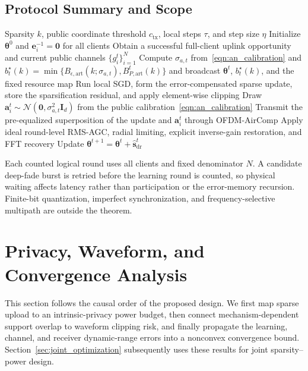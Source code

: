 \documentclass[journal]{IEEEtran}
\newenvironment{revisionblock}{\begingroup\color{revisionred}}{\endgroup}
\begin{document}
\begin{revisionblock}
\subsection{Protocol Summary and Scope}
\begin{algorithm}[t]
\small
\begin{algorithmic}[1]
\REQUIRE Sparsity $k$, public coordinate threshold $c_{\mathrm{tx}}$, local steps $\tau$, and step size $\eta$
\STATE Initialize $\boldsymbol\theta^0$ and $\mathbf e_i^{-1}=\mathbf0$ for all clients
\STATE Obtain a successful full-client uplink opportunity and current public channels $\{g_i^t\}_{i=1}^{N}$
\STATE Compute $\sigma_{a,t}$ from~\eqref{eqn:an_calibration} and $b_t^\star(k)=\min\{B_{\epsilon,\mathrm{art}}(k;\sigma_{a,t}),B_{P,\mathrm{art}}^t(k)\}$ and broadcast $\boldsymbol\theta^t$, $b_t^\star(k)$, and the fixed resource map
\STATE Run local SGD, form the error-compensated sparse update, store the sparsification residual, and apply element-wise clipping
\STATE Draw $\mathbf a_i^t\sim\mathcal N(\mathbf 0,\sigma_{a,t}^2\mathbf I_d)$ from the public calibration~\eqref{eqn:an_calibration}
\STATE Transmit the pre-equalized superposition of the update and $\mathbf a_i^t$ through OFDM-AirComp
\ENDFOR
\STATE Apply ideal round-level RMS-AGC, radial limiting, explicit inverse-gain restoration, and FFT recovery
\STATE Update $\boldsymbol\theta^{t+1}=\boldsymbol\theta^t+\hat{\mathbf s}_{\mathrm{dr}}^t$
\ENDFOR
\end{algorithmic}
\caption{Fixed-participation, per-round-private, dynamic-range-aware sparse OFDM-AirComp-FL.}
\label{alg:protocol}
\end{algorithm}
Each counted logical round uses all clients and fixed denominator $N$. A candidate deep-fade burst is retried before the learning round is counted, so physical waiting affects latency rather than participation or the error-memory recursion. Finite-bit quantization, imperfect synchronization, and frequency-selective multipath are outside the theorem.
\end{revisionblock}
\section{Privacy, Waveform, and Convergence Analysis}
\label{sec:analysis}
This section follows the causal order of the proposed design. We first map sparse upload to an intrinsic-privacy power budget, then connect mechanism-dependent support overlap to waveform clipping risk, and finally propagate the learning, channel, and receiver dynamic-range errors into a nonconvex convergence bound. Section~\ref{sec:joint_optimization} subsequently uses these results for joint sparsity--power design.
\end{document}
